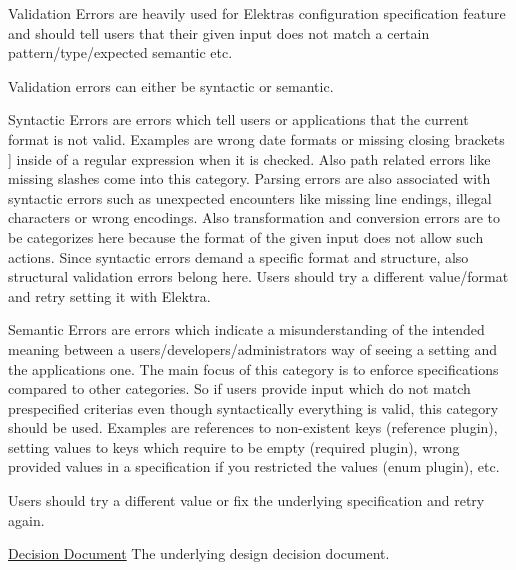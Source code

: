 {\ttfamily Validation Errors} are heavily used for Elektra\textquotesingle{}s {\ttfamily configuration specification} feature and should tell users that their given input does not match a certain pattern/type/expected semantic etc.

Validation errors can either be syntactic or semantic.

{\ttfamily Syntactic Errors} are errors which tell users or applications that the current format is not valid. Examples are wrong date formats or missing closing brackets {\ttfamily \mbox{]}} inside of a regular expression when it is checked. Also path related errors like missing slashes come into this category. Parsing errors are also associated with syntactic errors such as unexpected encounters like missing line endings, illegal characters or wrong encodings. Also transformation and conversion errors are to be categorizes here because the format of the given input does not allow such actions. Since syntactic errors demand a specific format and structure, also structural validation errors belong here. Users should try a different value/format and retry setting it with Elektra.

{\ttfamily Semantic Errors} are errors which indicate a misunderstanding of the intended meaning between a user\textquotesingle{}s/developer\textquotesingle{}s/administrator\textquotesingle{}s way of seeing a setting and the application\textquotesingle{}s one. The main focus of this category is to enforce specifications compared to other categories. So if users provide input which do not match prespecified criterias even though syntactically everything is valid, this category should be used. Examples are references to non-\/existent keys ({\ttfamily reference} plugin), setting values to keys which require to be empty ({\ttfamily required} plugin), wrong provided values in a specification if you restricted the values ({\ttfamily enum} plugin), etc.

Users should try a different value or fix the underlying specification and retry again.


\begin{DoxyItemize}
\item \hyperlink{doc_decisions_error_codes_md}{Decision Document} The underlying design decision document. 
\end{DoxyItemize}